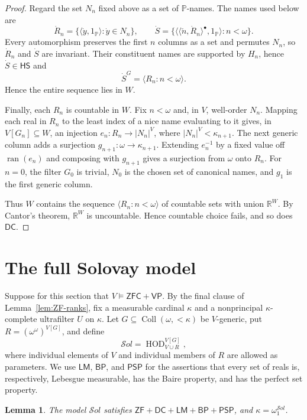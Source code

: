 \documentclass[11pt,a4paper]{amsart}
\newcommand{\VP}{\mathsf{VP}}
\newcommand{\ZF}{\mathsf{ZF}}
\newcommand{\ZFC}{\mathsf{ZFC}}
\newcommand{\HS}{\mathsf{HS}}
\newcommand{\HOD}{\operatorname{HOD}}
\newcommand{\Coll}{\operatorname{Coll}}
\newcommand{\DC}{\mathsf{DC}}
\newcommand{\LM}{\mathsf{LM}}
\newcommand{\BP}{\mathsf{BP}}
\newcommand{\PSP}{\mathsf{PSP}}
\theoremstyle{plain}
\newtheorem{lemma}[theorem]{Lemma}
\theoremstyle{definition}
\theoremstyle{remark}
\begin{document}
\begin{proof}
{Regard the set $N_n$ fixed above as a set of $\mathbb P$-names.  The names used below are}
\[
\dot R_n=\{\langle\dot y,1_{\mathbb P}\rangle:\dot y\in N_n\},
\qquad
\dot S=\{\langle\langle\check n,\dot R_n\rangle^\bullet,1_{\mathbb P}\rangle:n<\omega\}.
\]
Every automorphism preserves the first $n$ columns as a set and permutes $N_n$, so $\dot R_n$ and $\dot S$ are invariant.  Their constituent names are supported by $H_n$, hence $\dot S\in\HS$ and
\[
\dot S^G=\langle R_n:n<\omega\rangle.
\]
Hence the entire sequence lies in $W$.

Finally, each $R_n$ is countable in $W$.  {Fix $n<\omega$ and, in $V$, well-order $N_n$.  Mapping each real in $R_n$ to the least index of a nice name evaluating to it gives, in $V[G_n]\subseteq W$, an injection $e_n:R_n\longrightarrow |N_n|^V$, where $|N_n|^V<\kappa_{n+1}$.
{The next generic column adds a surjection $g_{n+1}:\omega\to\kappa_{n+1}$.  Extending $e_n^{-1}$ by a fixed value off $\operatorname{ran}(e_n)$ and composing with $g_{n+1}$ gives a surjection from $\omega$ onto $R_n$.  For $n=0$, the filter $G_0$ is trivial, $N_0$ is the chosen set of canonical names, and $g_1$ is the first generic column.}}

Thus $W$ contains the sequence $\langle R_n:n<\omega\rangle$ of countable sets with union $\mathbb R^W$.  By Cantor's theorem, $\mathbb R^W$ is uncountable.  Hence countable choice fails, and so does $\DC$.
\end{proof}
\endgroup

\section{The full Solovay model}

Suppose for this section that $V\models\ZFC+\VP$.  By the final clause of Lemma~\ref{lem:ZF-ranks}, fix a measurable cardinal $\kappa$ and a nonprincipal $\kappa$-complete ultrafilter $U$ on $\kappa$.  Let
$G\subseteq{\Coll}(\omega,{<}\kappa)$ be $V$-generic, put
$R=(\omega^\omega)^{V[G]}$, and define
\begin{equation}\label{eq:full-Solovay}
\mathcal S\!ol=\HOD_{V\cup R}^{V[G]},
\end{equation}
where individual elements of $V$ and individual members of $R$ are allowed as parameters.  We use $\LM$, $\BP$, and $\PSP$ for the assertions that every set of reals is, respectively, Lebesgue measurable, has the Baire property, and has the perfect set property.

\begin{lemma}\label{lem:Solovay-regularity}
The model $\mathcal S\!ol$ satisfies
$\ZF+\DC+\LM+\BP+\PSP$, and $\kappa=\omega_1^{\mathcal S\!ol}$.
\end{lemma}
\end{document}

